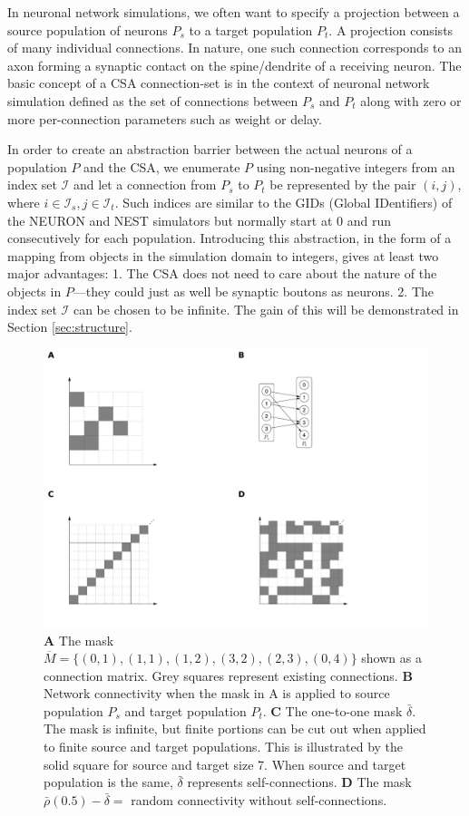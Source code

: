 \documentclass{frontiersSCNS} %
\begin{document}
In neuronal network simulations, we often want to specify a projection
between a source population of neurons $P_s$ to a target population
$P_t$.  A projection consists of many individual connections.  In
nature, one such connection corresponds to an axon forming a synaptic
contact on the spine/dendrite of a receiving neuron.  The basic
concept of a CSA connection-set is in the context of neuronal network
simulation defined as the set of connections between $P_s$ and $P_t$
along with zero or more per-connection parameters such as weight or
delay.

In order to create an abstraction barrier between the actual neurons
of a population $P$ and the CSA, we enumerate $P$ using non-negative
integers from an index set $\mathcal{I}$ and let a connection from
$P_s$ to $P_t$ be represented by the pair $(i, j)$, where $i \in
\mathcal{I}_s, j \in \mathcal{I}_t$.  Such indices are similar to
the GIDs (Global IDentifiers) of the NEURON and NEST simulators but
normally start at 0 and run consecutively for each population.
Introducing this abstraction, in the form of a mapping from objects in
the simulation domain to integers, gives at least two major
advantages: 1. The CSA does not need to care about the nature of the
objects in $P$---they could just as well be synaptic boutons as neurons.
2. The index set $\mathcal{I}$ can be chosen to be infinite.  The
gain of this will be demonstrated in Section \ref{sec:structure}.

\begin{figure}[ht]
\centering
\includegraphics[scale=.7]{figures/csa-pane.pdf}
\caption{
  \textbf{A} The mask $\overline{M} =
  \{(0,1), (1,1), (1,2), (3,2), (2,3), (0,4)\}$ shown as a connection
  matrix. Grey squares represent existing connections.
  \textbf{B} Network connectivity when the mask in A is applied to
  source population $P_s$ and target population
  $P_t$.
  \textbf{C} The one-to-one mask $\bar{\delta}$. The mask is infinite,
  but finite portions can be cut out when applied to finite source and
  target populations. This is illustrated by the solid square for
  source and target size 7. When source and target population is the
  same, $\bar{\delta}$ represents self-connections.
  \textbf{D} The mask $\bar{\rho}(0.5) - \bar{\delta} =$ random
  connectivity without self-connections.
}\label{fig:csa} 
\end{figure}
\end{document}
